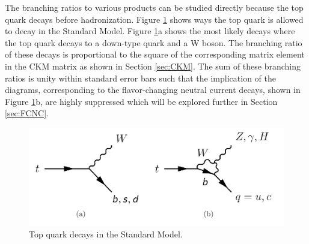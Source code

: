 The branching ratios to various products can be studied directly because the top quark decays before hadronization.  Figure \ref{fig:SMDecays} shows  ways the top quark is allowed to decay in the Standard Model.  Figure \ref{fig:SMDecays}a shows the most likely decays where the top quark decays to a down-type quark and a W boson.  The branching ratio of these decays is proportional to the square of the corresponding matrix element in the CKM matrix as shown in Section \ref{sec:CKM}.  The sum of these branching ratios is unity within standard error bars such that the implication of the diagrams, corresponding to the flavor-changing neutral current decays, shown in Figure \ref{fig:SMDecays}b, are highly suppressed which will be explored further in Section \ref{sec:FCNC}.  


\begin{figure}[h!]
	\centering
	\includegraphics[width=\columnwidth]{../ThesisImages/Theory/SMTopDecays.png}
	\caption[Top quark decays in the Standard Model.]{Top quark decays in the Standard Model.}
	\label{fig:SMDecays}
\end{figure}


